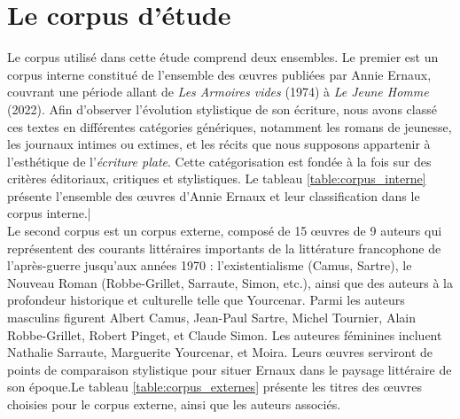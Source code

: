 \section{Le corpus d’étude}

Le corpus utilisé dans cette étude comprend deux ensembles. Le premier est un corpus interne constitué de l’ensemble des œuvres publiées par Annie Ernaux, couvrant une période allant de \textit{Les Armoires vides} (1974) à \textit{Le Jeune Homme} (2022). Afin d’observer l’évolution stylistique de son écriture, nous avons classé ces textes en différentes catégories génériques, notamment les romans de jeunesse, les journaux intimes ou extimes, et les récits que nous supposons appartenir à l’esthétique de l’\textit{écriture plate}. Cette catégorisation est fondée à la fois sur des critères éditoriaux, critiques et stylistiques. Le tableau \ref{table:corpus_interne} présente l’ensemble des œuvres d’Annie Ernaux et leur classification dans le corpus interne.|\\


Le second corpus est un corpus externe, composé de 15 œuvres de 9 auteurs qui représentent des courants littéraires importants de la littérature francophone de l'après-guerre jusqu'aux années 1970 : l'existentialisme (Camus, Sartre), le Nouveau Roman (Robbe-Grillet, Sarraute, Simon, etc.), ainsi que des auteurs à la profondeur historique et culturelle telle que Yourcenar. Parmi les auteurs masculins figurent Albert Camus, Jean-Paul Sartre, Michel Tournier, Alain Robbe-Grillet, Robert Pinget, et Claude Simon. Les auteures féminines incluent Nathalie Sarraute, Marguerite Yourcenar, et Moira. Leurs œuvres serviront de points de comparaison stylistique pour situer Ernaux dans le paysage littéraire de son époque.Le tableau \ref{table:corpus_externes} présente les titres des œuvres choisies pour le corpus externe, ainsi que les auteurs associés.




